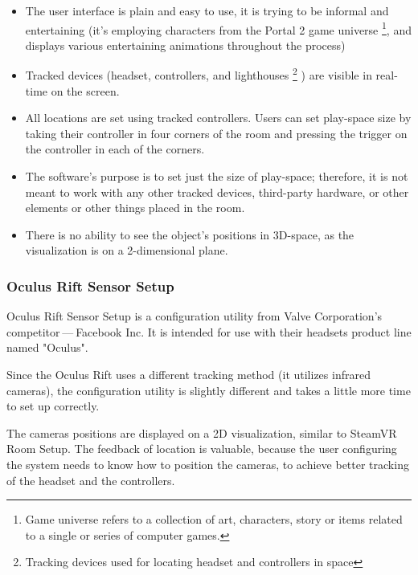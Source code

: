 \begin{itemize}

\item The user interface is plain and easy to use, it is trying to be informal
and entertaining (it’s employing characters from the Portal 2 game universe
\footnote{Game universe refers to a collection of art, characters, story or items related to a single or series of computer games.},
and displays various entertaining animations throughout the process)

\item Tracked devices (headset, controllers, and lighthouses
\footnote{Tracking devices used for locating headset and controllers in space}
) are visible in
real-time on the screen.

\item All locations are set using tracked controllers. Users can set play-space
size by taking their controller in four corners of the room and pressing
the trigger on the controller in each of the corners.

\item The software’s purpose is to set just the size of play-space; therefore, it is not
meant to work with any other tracked devices, third-party hardware, or other elements or
other things placed in the room.

\item There is no ability to see the object’s positions in 3D-space, as the visualization is
on a 2-dimensional plane.

\end{itemize}


\hypertarget{x-oculus-rift-sensor-setup}{\subsubsection*{Oculus Rift Sensor Setup}}
Oculus Rift Sensor Setup is a configuration utility from Valve Corporation’s
competitor — Facebook Inc. It is intended for use with their headsets
product line named "Oculus".


Since the Oculus Rift uses a different tracking method (it utilizes infrared cameras),
the configuration utility is slightly different and takes a little more
time to set up correctly.


The cameras positions are displayed on a 2D visualization, similar
to SteamVR Room Setup. The feedback of location is valuable, because the
user configuring the system needs to know how to position the
cameras, to achieve better tracking of the headset and the controllers.


